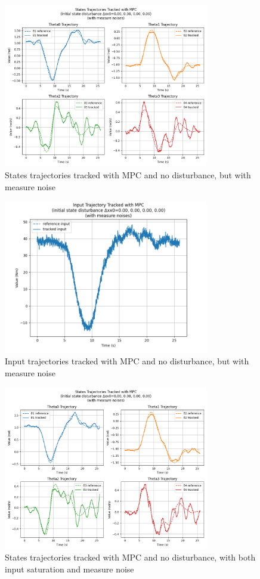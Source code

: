 \documentclass[a4paper,11pt,oneside]{book}
\begin{document}
\begin{figure}[H]
    \centering
    \includegraphics[width=0.8\textwidth]{state_traj_mpc_mn.png}
    \caption{States trajectories tracked with MPC and no disturbance, but with measure noise}
    \label{fig:enter-label}
\end{figure}
\begin{figure}[H]
    \centering
    \includegraphics[width=0.8\textwidth]{input_mpc_mn.png}
    \caption{Input trajectories tracked with MPC and no disturbance, but with measure noise}
    \label{fig:enter-label}
\end{figure}
\begin{figure}[H]
    \centering
    \includegraphics[width=0.8\textwidth]{state_traj_MPC_mnac.png}
    \caption{States trajectories tracked with MPC and no disturbance, with both input saturation and measure noise}
    \label{fig:enter-label}
\end{figure}
\end{document}

